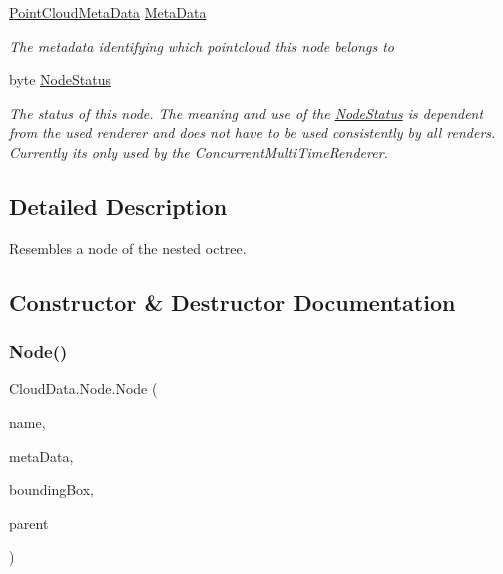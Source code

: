 \begin{DoxyCompactItemize}
\hyperlink{class_cloud_data_1_1_point_cloud_meta_data}{Point\+Cloud\+Meta\+Data} \hyperlink{class_cloud_data_1_1_node_acc0afd56fb7f3c0c22fdfda9c43dce0c}{Meta\+Data}
\begin{DoxyCompactList}\small\item\em The metadata identifying which pointcloud this node belongs to \end{DoxyCompactList}\item 
byte \hyperlink{class_cloud_data_1_1_node_add6b3b455a1b95a74506a849a1081f28}{Node\+Status}
\begin{DoxyCompactList}\small\item\em The status of this node. The meaning and use of the \hyperlink{class_cloud_data_1_1_node_status}{Node\+Status} is dependent from the used renderer and does not have to be used consistently by all renders. Currently its only used by the Concurrent\+Multi\+Time\+Renderer. \end{DoxyCompactList}\end{DoxyCompactItemize}


\subsection{Detailed Description}
Resembles a node of the nested octree. 



\subsection{Constructor \& Destructor Documentation}
\mbox{\label{class_cloud_data_1_1_node_a6540b5d8cb8fc40067560b3c002d574c}} 
\subsubsection{\texorpdfstring{Node()}{Node()}}
{\footnotesize\ttfamily Cloud\+Data.\+Node.\+Node (\begin{DoxyParamCaption}\item[{string}]{name,  }\item[{\hyperlink{class_cloud_data_1_1_point_cloud_meta_data}{Point\+Cloud\+Meta\+Data}}]{meta\+Data,  }\item[{\hyperlink{class_cloud_data_1_1_bounding_box}{Bounding\+Box}}]{bounding\+Box,  }\item[{\hyperlink{class_cloud_data_1_1_node}{Node}}]{parent }\end{DoxyParamCaption})\hspace{0.3cm}{\ttfamily [inline]}}



